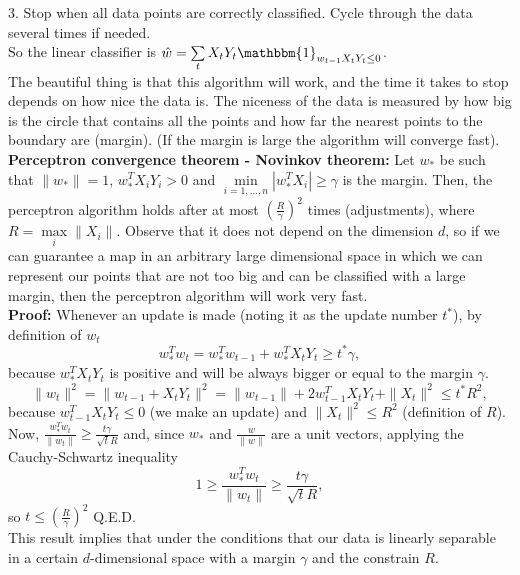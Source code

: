 \documentclass[11pt, english]{article}
\newcommand{\su}[2]{\sum\limits_{#1}^{#2}}
\begin{document}
3. Stop when all data points are correctly classified. Cycle through the data several times if needed. \\%
So the linear classifier is $\hat{w}=\su{t}{}X_tY_t\mathbbm{1}_{w_{t-1}X_tY_t\leq 0}$.\\

The beautiful thing is that this algorithm will work, and the time it takes to stop depends on how nice the data is. The niceness of the data is measured by how big is the circle that contains all the points and how far the nearest points to the boundary are (margin). (If the margin is large the algorithm will converge fast).\\

\textbf{Perceptron convergence theorem - Novinkov theorem: }Let $w_*$ be such that $\|w_*\|=1$, $w_*^TX_iY_i>0$ and $\underset{i=1,\dots,n}{\min}|w_*^TX_i|\geq\gamma$ is the margin. Then, the perceptron algorithm holds after at most $\left(\frac{R}{\gamma}\right)^2$ times (adjustments), where $R=\underset{i}{\max}\|X_i\|$. Observe that it does not depend on the dimension $d$, so if we can guarantee a map in an arbitrary large dimensional space in which we can represent our points that are not too big and can be classified with a large margin, then the perceptron algorithm will work very fast.\\%

\textbf{Proof:} Whenever an update is made (noting it as the update number $t^*$), by definition of $w_t$
\begin{equation}
	w_*^Tw_t= w_*^Tw_{t-1} + w_*^TX_tY_t\geq t^*\gamma,	
\end{equation}
because $w_*^TX_tY_t$ is positive and will be always bigger or equal to the margin $\gamma$.
\begin{equation}
	\|w_t\|^2=\|w_{t-1}+X_tY_t\|^2=\|w_{t-1}\|+2w_{t-1}^TX_tY_t+\|X_t\|^2\leq t^*R^2,
\end{equation} 
because $w_{t-1}^TX_tY_t\leq 0$ (we make an update) and $\|X_t\|^2\leq R^2$ (definition of $R$). Now, $\frac{w_*^Tw_t}{\|w_t\|}\geq \frac{t \gamma}{\sqrt{t}R}$ and, since $w_*$ and $\frac{w}{\|w\|}$ are a unit vectors, applying the Cauchy-Schwartz inequality 
\begin{equation}
	1\geq \frac{w_*^Tw_t}{\|w_t\|}\geq \frac{t \gamma}{\sqrt{t}R},
\end{equation} 
so $t\leq\left(\frac{R}{\gamma}\right)^2$ Q.E.D.\\

This result implies that under the conditions that our data is linearly separable in a certain $d$-dimensional space with a margin $\gamma$ and the constrain $R$.
\end{document}

